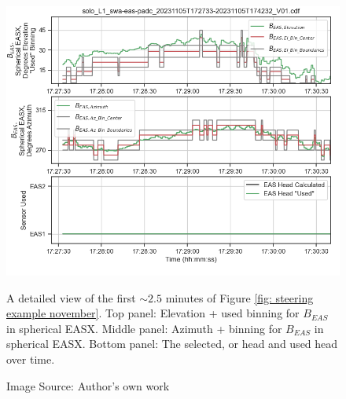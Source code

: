 \begin{figure}[h!]
    \centering
    \centerfloat
    \includegraphics[width=1.05\linewidth]{figures/Steering Example Detail Start (bin issue).png}
    \caption{A detailed view of the first \(\sim2.5\) minutes of Figure \ref{fig: steering example november}. Top panel: Elevation + used binning for \(B_{EAS}\) in spherical EASX. Middle panel: Azimuth + binning for \(B_{EAS}\) in spherical EASX. Bottom panel: The selected, or  head and used head over time.}
    \caption*{Image Source: Author's own work}
    \label{fig: november bin error detail}
\end{figure}

